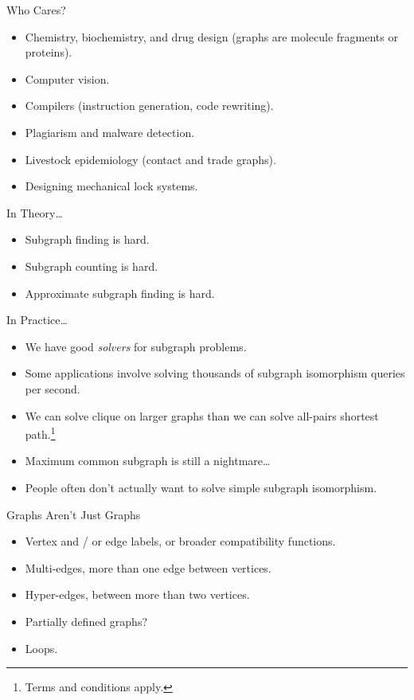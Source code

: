 \documentclass[aspectratio=169,compress,10pt]{beamer}
\begin{document}
\begin{frame}{Who Cares?}
    \begin{itemize}
        \item Chemistry, biochemistry, and drug design (graphs are molecule fragments or proteins).
        \item Computer vision.
        \item Compilers (instruction generation, code rewriting).
        \item Plagiarism and malware detection.
        \item Livestock epidemiology (contact and trade graphs).
        \item Designing mechanical lock systems.
    \end{itemize}
\end{frame}

\begin{frame}{In Theory\ldots}
    \begin{itemize}
        \item Subgraph finding is hard.
        \item Subgraph counting is hard.
        \item Approximate subgraph finding is hard.
    \end{itemize}
\end{frame}

\begin{frame}{In Practice\ldots}
    \begin{itemize}
        \item We have good \emph{solvers} for subgraph problems.
        \item Some applications involve solving thousands of subgraph isomorphism queries per second.
        \item We can solve clique on larger graphs than we can solve all-pairs
            shortest path.\footnote{Terms and conditions apply.}
        \item<2-> Maximum common subgraph is still a nightmare\ldots
        \item<3-> People often don't actually want to solve simple subgraph isomorphism.
    \end{itemize}
\end{frame}

\begin{frame}{Graphs Aren't Just Graphs}
    \begin{itemize}
        \item Vertex and / or edge labels, or broader compatibility functions.
        \item Multi-edges, more than one edge between vertices.
        \item Hyper-edges, between more than two vertices.
        \item Partially defined graphs?
        \item Loops.
    \end{itemize}
\end{frame}
\end{document}
